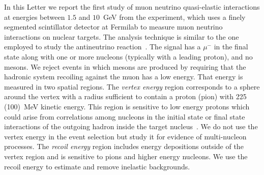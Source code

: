 In this Letter we report the first study of muon neutrino
quasi-elastic interactions at energies between $1.5$ and $10$~GeV from the \minerva experiment, which uses a
finely segmented scintillator detector at Fermilab to measure muon
neutrino interactions on 
nuclear targets.  The analysis technique is similar to the one
employed to study the antineutrino reaction~\cite{nubarprl}.  The signal
has a $\mu^-$ in the final state along with one or more nucleons
(typically with a leading proton), and no mesons.  We reject events in
which mesons are produced by requiring that the hadronic system
recoiling against the muon has a low energy. That energy is measured
in two spatial regions. The {\it vertex energy} region corresponds to
a sphere around the vertex with a radius sufficient to contain a
proton (pion) with 225 (100)~MeV kinetic energy. This region is
sensitive to low energy protons which could arise from correlations
among nucleons in the initial state or final state interactions of the outgoing
hadron inside the target nucleus~\cite{Sobczyk:2012ms}. 
We do not use the vertex energy in
the event selection but study it for evidence of multi-nucleon
processes.  The {\it recoil energy} region includes energy depositions
outside of the vertex region and is sensitive to pions and higher
energy nucleons. We use the recoil energy to estimate and remove
inelastic backgrounds.


